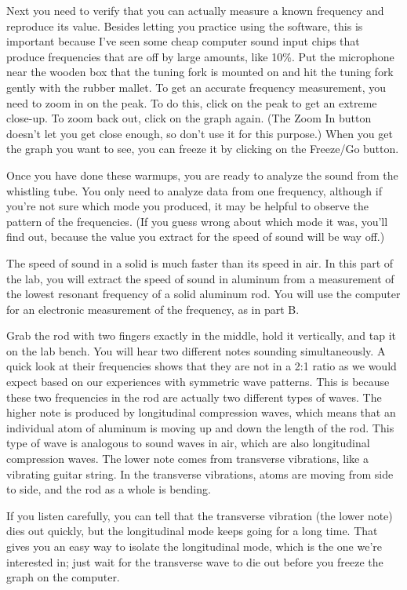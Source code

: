 Next you need to verify that you can actually measure a known frequency and reproduce its value.
Besides letting you practice using the software,
this is important because I've seen some cheap computer sound input chips that produce frequencies that are off by large amounts, like 10\%.
Put the microphone near the wooden box that the tuning fork is mounted on and hit the tuning fork gently with the rubber mallet.
To get an accurate frequency measurement, you need to zoom in on the peak.
To do this, click on the peak to get an extreme close-up. To zoom back out, click on the graph again.
(The Zoom In button doesn't let you get close enough, so don't use it for this purpose.)
When you get
the graph you want to see, you can freeze it by clicking on the
Freeze/Go button.

Once you have done these warmups, you are ready to analyze
the sound from the whistling tube. You only need
to analyze data from one frequency, although if you're not sure
which mode you produced, it may be helpful to observe the
pattern of the frequencies. (If you guess wrong about which
mode it was, you'll find out, because the value you extract for
the speed of sound will be way off.)


The speed of sound in a solid is much faster than its
speed in air.  In this part of the lab, you will extract the
speed of sound in aluminum from a measurement of the lowest
resonant frequency of a solid aluminum rod.  You will use
the computer for an electronic measurement of the frequency, as in part B.

Grab the rod with two fingers exactly in the middle, hold it vertically, and
tap it on the lab bench.  You will hear two different notes
sounding simultaneously. A quick look at their frequencies shows that they are
not in a 2:1 ratio as we would expect based on our experiences with symmetric
wave patterns. This is because these two frequencies in the rod are actually
two different types of waves.
 The higher note is produced by longitudinal compression waves,
which means that an individual atom of aluminum is moving up
and down the length of the rod.  This type of wave is
analogous to sound waves in air, which are also longitudinal
compression waves.  The lower note comes from transverse
vibrations, like a vibrating guitar string.  In the
transverse vibrations, atoms are moving from side to side,
and the rod as a whole is bending.

If you listen carefully, you can tell that the transverse
vibration (the lower note) dies out quickly, but the
longitudinal mode keeps going for a long time.  That gives
you an easy way to isolate the longitudinal mode, which is
the one we're interested in; just wait for the transverse
wave to die out before you freeze the graph on the computer.

